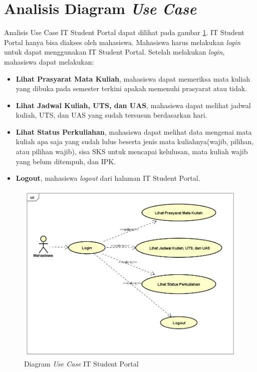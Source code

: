 \section{Analisis Diagram \textit{Use Case}}
Analisis Use Case IT Student Portal dapat dilihat pada gambar \ref{fig:3_usecase_diagram}. IT Student Portal hanya bisa diakses oleh mahasiswa. Mahasiswa harus melakukan \textit{login} untuk dapat menggunakan IT Student Portal. Setelah melakukan \textit{login}, mahasiswa dapat melakukan:
\begin{itemize}
	\item \textbf{Lihat Prasyarat Mata Kuliah}, mahasiswa dapat memeriksa mata kuliah yang dibuka pada semester terkini apakah memenuhi prasyarat atau tidak. 
	\item \textbf{Lihat Jadwal Kuliah, UTS, dan UAS}, mahasiswa dapat melihat jadwal kuliah, UTS, dan UAS yang sudah tersusun berdasarkan hari.
	\item \textbf{Lihat Status Perkuliahan}, mahasiswa dapat melihat data mengenai mata kuliah apa saja yang sudah lulus beserta jenis mata kuliahnya(wajib, pilihan, atau pilihan wajib), sisa SKS untuk mencapai kelulusan, mata kuliah wajib yang belum ditempuh, dan IPK.
	\item \textbf{Logout}, mahasiswa \textit{logout} dari halaman IT Student Portal.
\end{itemize}
		\begin{figure}[H]
			\centering
			\includegraphics[scale=0.5]{Gambar/usecase-diagram}
			\caption{Diagram \textit{Use Case }IT Student Portal} 
			\label{fig:3_usecase_diagram}
		\end{figure}
		